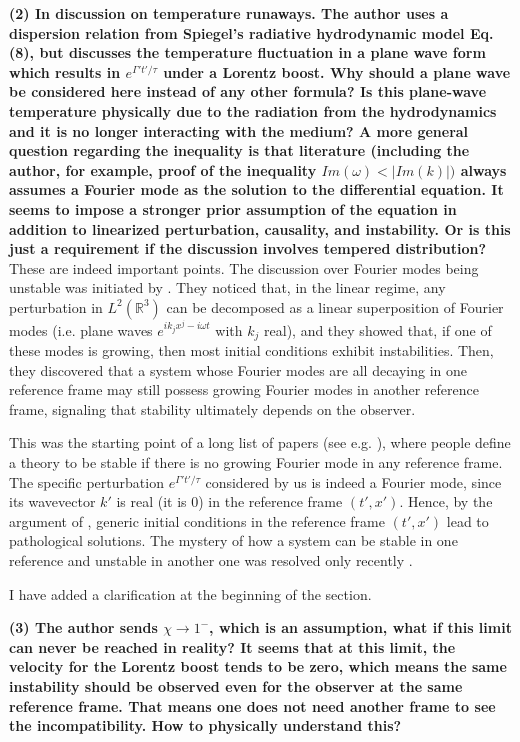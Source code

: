 \documentclass[PRD,onecolumn, nofootinbib]{revtex4-1}
\begin{document}
{\bf (2) In discussion on temperature runaways. The author uses a dispersion relation
from Spiegel's radiative hydrodynamic model Eq. (8), but discusses the
temperature fluctuation in a plane wave form which results in $e^{\Gamma' t'/\tau}$ under a Lorentz boost. Why should a plane wave be considered here instead of any
other formula? Is this plane-wave temperature physically due to the radiation
from the hydrodynamics and it is no longer interacting with the medium? A more
general question regarding the inequality is that literature (including the
author, for example, proof of the inequality $Im(\omega)<|Im(k)|)$ always assumes
a Fourier mode as the solution to the differential equation. It seems to impose
a stronger prior assumption of the equation in addition to linearized
perturbation, causality, and instability. Or is this just a requirement if the
discussion involves tempered distribution?}\\

These are indeed important points. The discussion over Fourier modes being unstable was initiated by \citet{Hiscock_Insatibility_first_order}. They noticed that, in the linear regime, any perturbation in $L^2(\mathbb{R}^3)$ can be decomposed as a linear superposition of Fourier modes (i.e. plane waves $e^{ik_jx^j-i\omega t}$ with $k_j$ real), and they showed that, if one of these modes is growing, then most initial conditions exhibit instabilities. Then, they discovered that a system whose Fourier modes are all decaying in one reference frame may still possess growing Fourier modes in another reference frame, signaling that stability ultimately depends on the observer.

This was the starting point of a long list of papers (see e.g. \cite{Kost2000,PuKoide2009fj,Kovtun2019,BemficaDNDefinitivo2020,GavassinoLyapunov_2020}), where people define a theory to be stable if there is no growing Fourier mode in any reference frame. The specific perturbation $e^{\Gamma' t'/\tau}$ considered by us is indeed a Fourier mode, since its wavevector $k'$ is real (it is 0) in the reference frame $(t',x')$. Hence, by the argument of \citet{Hiscock_Insatibility_first_order}, generic initial conditions in the reference frame $(t',x')$ lead to pathological solutions. The mystery of how a system can be stable in one reference and unstable in another one was resolved only recently \cite{GavassinoSuperluminal2021}. 

I have added a clarification at the beginning of the section.


{\bf (3) The author sends $\chi\to 1^-$, which is an assumption, what if this limit can
never be reached in reality? It seems that at this limit, the velocity for the
Lorentz boost tends to be zero, which means the same instability should be
observed even for the observer at the same reference frame. That means one does
not need another frame to see the incompatibility. How to physically understand
this?}\\
\end{document}
